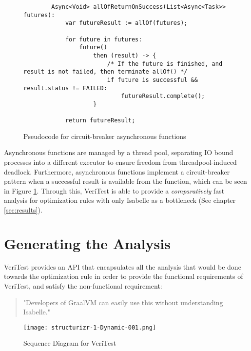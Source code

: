 \begin{figure}[!htb]
    \begin{lstlisting}
        Async<Void> allOfReturnOnSuccess(List<Async<Task>> futures):
            var futureResult := allOf(futures);

            for future in futures:
                future()
                    then (result) -> {
                        /* If the future is finished, and result is not failed, then terminate allOf() */
                        if future is successful && result.status != FAILED:
                            futureResult.complete();
                    }

            return futureResult;
    \end{lstlisting}

    \caption{Pseudocode for circuit-breaker asynchronous functions}
    \label{fig:circuitBreaker}
\end{figure}

Asynchronous functions are managed by a thread pool, separating IO bound processes into a different executor to ensure freedom from 
threadpool-induced deadlock. Furthermore, asynchronous functions implement a circuit-breaker pattern when a successful result is available 
from the function, which can be seen in Figure \ref{fig:circuitBreaker}. Through this, VeriTest is able to provide a \emph{comparatively} 
fast analysis for optimization rules with only Isabelle as a bottleneck (See chapter \ref{sec:results}).

\section{Generating the Analysis}
\label{sec:generateAnalysis}

VeriTest provides an API that encapsulates all the analysis that would be done towards the optimization rule 
in order to provide the functional requirements of VeriTest, and satisfy the non-functional requirement:

\begin{quote}
    "Developers of GraalVM can easily use this without understanding Isabelle."
\end{quote}

\begin{figure}[h]
    \centering
    \texttt{[image: structurizr-1-Dynamic-001.png]}
    \caption{Sequence Diagram for VeriTest}
    \label{fig:sequenceDiagram}
\end{figure}


